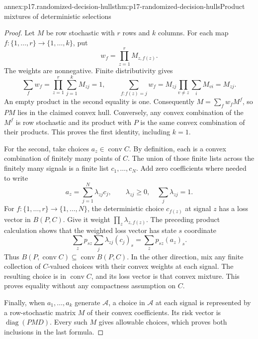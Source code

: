 
\begin{annexitem}{annex:p17.randomized-decision-hulls}{thm:p17-randomized-decision-hulls}{Product mixtures of deterministic selections}
\begin{proof}
Let \(M\) be row stochastic with \(r\) rows and \(k\) columns. For each
map \(f:\{1,\ldots,r\}\to\{1,\ldots,k\}\), put
\[
                           w_f=\prod_{z=1}^r M_{z,f(z)}.
\]
The weights are nonnegative. Finite distributivity gives
\[
 \sum_f w_f=\prod_{z=1}^r\sum_{j=1}^kM_{zj}=1,\qquad
 \sum_{f:f(z)=j}w_f=M_{zj}\prod_{v\ne z}\sum_iM_{vi}=M_{zj}.
\]
An empty product in the second equality is one.
Consequently \(M=\sum_f w_fM^f\), so \(PM\) lies in the claimed convex
hull. Conversely, any convex combination of the \(M^f\) is row stochastic
and its product with \(P\) is the same convex combination of their products.
This proves the first identity, including \(k=1\).

For the second, take choices \(a_z\in\operatorname{conv}C\).
By definition, each is a convex combination of finitely many points of
\(C\). The union of those finite lists across the finitely many signals
is a finite list \(c_1,\ldots,c_N\). Add zero coefficients where needed
to write
\[
                   a_z=\sum_{j=1}^N\lambda_{zj}c_j,\qquad
                   \lambda_{zj}\geq0,\quad\sum_j\lambda_{zj}=1.
\]
For \(f:\{1,\ldots,r\}\to\{1,\ldots,N\}\), the deterministic choice
\(c_{f(z)}\) at signal \(z\) has a loss vector in \(B(P,C)\).
Give it weight \(\prod_z\lambda_{z,f(z)}\).
The preceding product calculation shows that the weighted loss vector
has state \(s\) coordinate
\[
             \sum_zp_{sz}\sum_j\lambda_{zj}(c_j)_s
                         =\sum_zp_{sz}(a_z)_s.
\]
Thus \(B(P,\operatorname{conv}C)\subseteq\operatorname{conv}B(P,C)\).
In the other direction, mix any finite collection of \(C\)-valued choices
with their convex weights at each signal. The resulting choice is in
\(\operatorname{conv}C\), and its loss vector is that convex mixture.
This proves equality without any compactness assumption on \(C\).

Finally, when \(a_1,\ldots,a_k\) generate \(\mathcal A\), a choice in
\(\mathcal A\) at each signal is represented by a row-stochastic matrix
\(M\) of their convex coefficients. Its risk vector is
\(\operatorname{diag}(PMD)\). Every such \(M\) gives allowable choices,
which proves both inclusions in the last formula.
\end{proof}
\end{annexitem}

